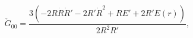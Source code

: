 \begin{equation}
\check{G}_{00}=\frac{3\left(-2R\dot{R}\dot{R}'-2R'\dot{R}^2+RE'+2R'E(r)\right)}{2R^2R'},
\end{equation}

